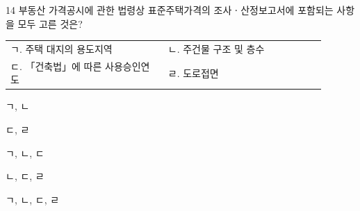 \begin{question}{14}
부동산 가격공시에 관한 법령상 표준주택가격의 조사ㆍ산정보고서에 포함되는 사항을 모두 고른 것은?
\begin{framedtext}
\begin{tabular}{@{}p{0.45\linewidth}p{0.45\linewidth}@{}}
ㄱ. 주택 대지의 용도지역 & ㄴ. 주건물 구조 및 층수 \tabularnewline
ㄷ. 「건축법」에 따른 사용승인연도 & ㄹ. 도로접면 \tabularnewline
\end{tabular}
\end{framedtext}
\begin{choices}
  \item ㄱ, ㄴ
  \item ㄷ, ㄹ
  \item ㄱ, ㄴ, ㄷ
  \item ㄴ, ㄷ, ㄹ
  \item ㄱ, ㄴ, ㄷ, ㄹ
\end{choices}
\end{question}
